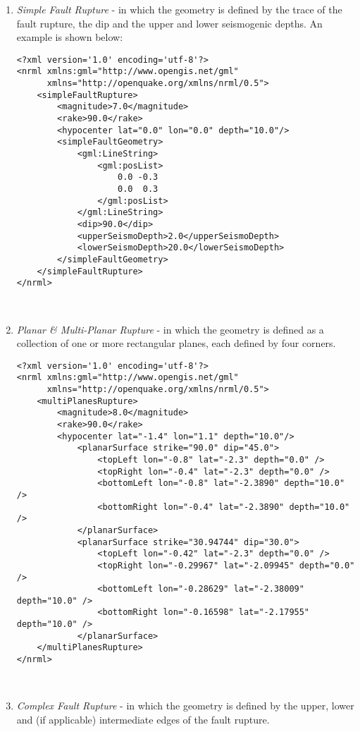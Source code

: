 \begin{enumerate}
    \item \emph{Simple Fault Rupture} - in which the geometry is defined by the trace of the fault rupture, the dip and the upper and lower seismogenic depths. An example is shown below:
\begin{verbatim}
<?xml version='1.0' encoding='utf-8'?>
<nrml xmlns:gml="http://www.opengis.net/gml"
      xmlns="http://openquake.org/xmlns/nrml/0.5">
    <simpleFaultRupture>
        <magnitude>7.0</magnitude>
        <rake>90.0</rake>
        <hypocenter lat="0.0" lon="0.0" depth="10.0"/>
        <simpleFaultGeometry>
            <gml:LineString>
                <gml:posList>
                    0.0 -0.3
                    0.0  0.3
                </gml:posList>
            </gml:LineString>
            <dip>90.0</dip>
            <upperSeismoDepth>2.0</upperSeismoDepth>
            <lowerSeismoDepth>20.0</lowerSeismoDepth>
        </simpleFaultGeometry>
    </simpleFaultRupture>
</nrml>
\end{verbatim}
\\
    \item \emph{Planar \& Multi-Planar Rupture} - in which the geometry is defined as a collection of one or more rectangular planes, each defined by four corners.

    \begin{verbatim}
<?xml version='1.0' encoding='utf-8'?>
<nrml xmlns:gml="http://www.opengis.net/gml"
      xmlns="http://openquake.org/xmlns/nrml/0.5">
    <multiPlanesRupture>
        <magnitude>8.0</magnitude>
        <rake>90.0</rake>
        <hypocenter lat="-1.4" lon="1.1" depth="10.0"/>
            <planarSurface strike="90.0" dip="45.0">
                <topLeft lon="-0.8" lat="-2.3" depth="0.0" />
                <topRight lon="-0.4" lat="-2.3" depth="0.0" />
                <bottomLeft lon="-0.8" lat="-2.3890" depth="10.0" />
                <bottomRight lon="-0.4" lat="-2.3890" depth="10.0" />
            </planarSurface>
            <planarSurface strike="30.94744" dip="30.0">
                <topLeft lon="-0.42" lat="-2.3" depth="0.0" />
                <topRight lon="-0.29967" lat="-2.09945" depth="0.0" />
                <bottomLeft lon="-0.28629" lat="-2.38009" depth="10.0" />
                <bottomRight lon="-0.16598" lat="-2.17955" depth="10.0" />
            </planarSurface>
    </multiPlanesRupture>
</nrml> 
\end{verbatim}
\\
    \item \emph{Complex Fault Rupture} - in which the geometry is defined by the upper, lower and (if applicable) intermediate edges of the fault rupture.


\end{enumerate}
